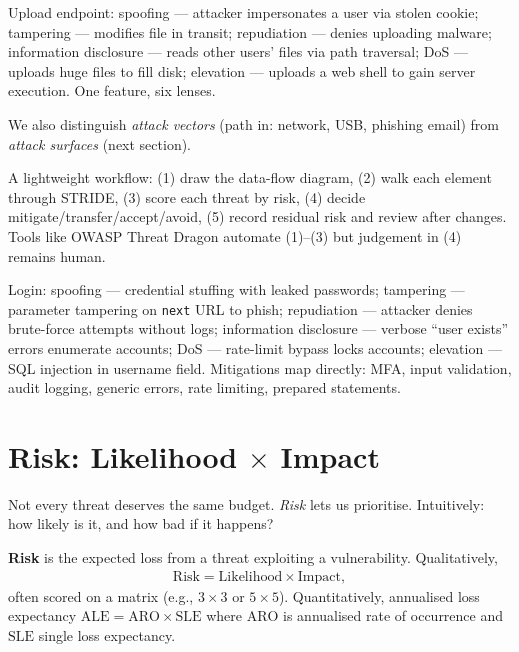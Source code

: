 \begin{example}
Upload endpoint: spoofing --- attacker impersonates a user via stolen cookie; tampering --- modifies file in transit; repudiation --- denies uploading malware; information disclosure --- reads other users' files via path traversal; DoS --- uploads huge files to fill disk; elevation --- uploads a web shell to gain server execution. One feature, six lenses.
\end{example}

We also distinguish \emph{attack vectors} (path in: network, USB, phishing email) from \emph{attack surfaces} (next section).

\begin{remark}
A lightweight workflow: (1) draw the data-flow diagram, (2) walk each element through STRIDE, (3) score each threat by risk, (4) decide mitigate/transfer/accept/avoid, (5) record residual risk and review after changes. Tools like OWASP Threat Dragon automate (1)--(3) but judgement in (4) remains human.
\end{remark}

\begin{example}
Login: spoofing --- credential stuffing with leaked passwords; tampering --- parameter tampering on \texttt{next} URL to phish; repudiation --- attacker denies brute-force attempts without logs; information disclosure --- verbose ``user exists'' errors enumerate accounts; DoS --- rate-limit bypass locks accounts; elevation --- SQL injection in username field. Mitigations map directly: MFA, input validation, audit logging, generic errors, rate limiting, prepared statements.
\end{example}

\section{Risk: Likelihood \texorpdfstring{$\times$}{x} Impact}
\label{sec:risk}
Not every threat deserves the same budget. \emph{Risk} lets us prioritise. Intuitively: how likely is it, and how bad if it happens?

\begin{definition}[Risk]
\textbf{Risk} is the expected loss from a threat exploiting a vulnerability. Qualitatively,
\begin{align}
\text{Risk} = \text{Likelihood} \times \text{Impact},
\label{eq:risk}
\end{align}
often scored on a matrix (e.g., $3\times 3$ or $5\times 5$). Quantitatively, annualised loss expectancy $\text{ALE}=\text{ARO}\times\text{SLE}$ where $\text{ARO}$ is annualised rate of occurrence and $\text{SLE}$ single loss expectancy.
\end{definition}

